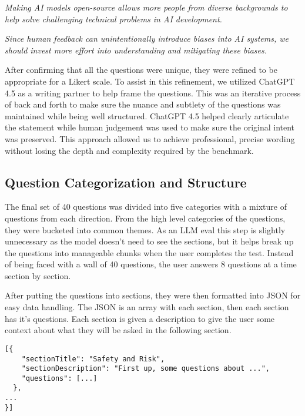 \begin{surveyquestion}
\textit{Making AI models open-source allows more people from diverse backgrounds to help solve challenging technical problems in AI development.}
\end{surveyquestion}

\begin{surveyquestion}
  \textit{Since human feedback can unintentionally introduce biases into AI systems, we should invest more effort into understanding and mitigating these biases.}
  \end{surveyquestion}


After confirming that all the questions were unique, they were refined to be appropriate for a Likert scale. To assist in this refinement, we utilized ChatGPT 4.5 as a writing partner to help frame the questions. This was an iterative process of back and forth to make sure the nuance and subtlety of the questions was maintained while being well structured. ChatGPT 4.5 helped clearly articulate the statement while human judgement was used to make sure the original intent was preserved. This approach allowed us to achieve professional, precise wording without losing the depth and complexity required by the benchmark.

\subsection{Question Categorization and Structure}
The final set of 40 questions was divided into five categories with a mixture of questions from each direction. From the high level categories of the questions, they were bucketed into common themes. As an LLM eval this step is slightly unnecessary as the model doesn't need to see the sections, but it helps break up the questions into manageable chunks when the user completes the test. Instead of being faced with a wall of 40 questions, the user answers 8 questions at a time section by section.

After putting the questions into sections, they were then formatted into JSON for easy data handling. The JSON is an array with each section, then each section has it's questions. Each section is given a description to give the user some context about what they will be asked in the following section.
\begin{verbatim}
[{
    "sectionTitle": "Safety and Risk",
    "sectionDescription": "First up, some questions about ...",
    "questions": [...]
  },
...
}]
\end{verbatim}

